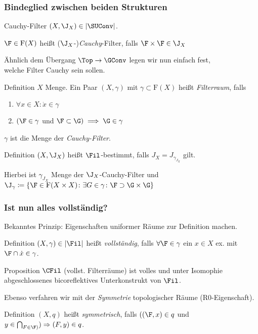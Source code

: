 \begin{frame}
  \frametitle{Bindeglied zwischen beiden Strukturen}
  \begin{block}{Cauchy-Filter}
    $(X,\J_X) \in |\SUConv|$.

    $\F \in \mathrm{F}(X)$ heißt ($\J_X$-)\emph{Cauchy}-Filter, falls $\F \times \F \in \J_X$
  \end{block}

  Ähnlich dem Übergang $\Top \to \GConv$ legen wir nun einfach fest,\\ welche Filter Cauchy sein sollen.

  \begin{block}{Definition}
    $X$ Menge. Ein Paar $(X, \gamma)$ mit $\gamma \subset \mathrm{F}(X)$ heißt \emph{Filterraum}, falls
    \begin{enumerate}[F1)]
      \item $\forall x \in X \colon \dot x \in \gamma$
      \item $(\F \in \gamma$ und $\F \subset \G) \implies \G \in \gamma$
    \end{enumerate}
    $\gamma$ ist die Menge der \emph{Cauchy-Filter}.
  \end{block}

  \begin{block}{Definition}
    $(X, \J_X)$ heißt $\Fil$-bestimmt, falls $J_X = J_{\gamma_{J_X}}$ gilt. 
    
    Hierbei ist
    $\gamma_{J_X}$ Menge der $\J_X$-Cauchy-Filter und $\J_\gamma \coloneqq \{ \F \in \mathrm{F}(X \times X) \colon \exists G \in \gamma \colon \F \supset \G \times \G\}$
  \end{block}
\end{frame}

\begin{frame}
  \frametitle{Ist nun alles vollständig?}

  Bekanntes Prinzip: Eigenschaften uniformer Räume zur Definition machen.

  \begin{block}{Definition}
    $(X, \gamma) \in |\Fil|$ heißt \emph{vollständig}, falls $\forall \F \in \gamma$ ein $x \in X$ ex. mit $\F \cap \dot x \in \gamma$.
  \end{block}

  \begin{block}{Proposition}
    $\CFil$ (vollst. Filterräume) ist volles und unter Isomophie abgeschlossenes bicoreflektives Unterkonstrukt von $\Fil$.
  \end{block}

  Ebenso verfahren wir mit der \emph{Symmetrie} topologischer Räume (R0-Eigenschaft).

  \begin{block}{Definition}
    $(X,q)$ heißt \emph{symmetrisch}, falls $((\F,x) \in q$  und $y \in \bigcap _{F \in \F)}) \Rightarrow (F,y) \in q$.
  \end{block}
\end{frame}

